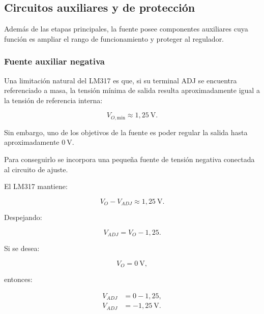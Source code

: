 \documentclass[12pt,a4paper]{article}
\begin{document}
	\subsection{Circuitos auxiliares y de protección}
	
	Además de las etapas principales, la fuente posee componentes auxiliares cuya
	función es ampliar el rango de funcionamiento y proteger al regulador.
	
	\subsubsection{Fuente auxiliar negativa}
	
	Una limitación natural del LM317 es que, si su terminal ADJ se encuentra
	referenciado a masa, la tensión mínima de salida resulta aproximadamente igual a
	la tensión de referencia interna:
	
	\begin{equation}
		V_{O,\mathrm{min}}
		\approx
		1,25~\text{V}.
	\end{equation}
	
	Sin embargo, uno de los objetivos de la fuente es poder regular la salida hasta
	aproximadamente $0~\text{V}$.
	
	Para conseguirlo se incorpora una pequeña fuente de tensión negativa conectada
	al circuito de ajuste.
	
	El LM317 mantiene:
	
	\begin{equation}
		V_O-V_{ADJ}
		\approx
		1,25~\text{V}.
	\end{equation}
	
	Despejando:
	
	\begin{equation}
		V_{ADJ}
		=
		V_O-1,25.
	\end{equation}
	
	Si se desea:
	
	\begin{equation}
		V_O
		=
		0~\text{V},
	\end{equation}
	
	entonces:
	
	\begin{align}
		V_{ADJ}
		&=
		0-1,25,
		\\
		V_{ADJ}
		&=
		-1,25~\text{V}.
	\end{align}
	
\end{document}
